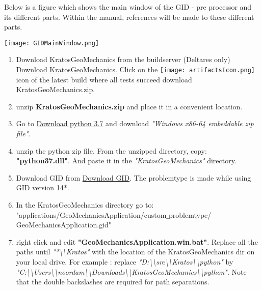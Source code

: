 Below is a figure which shows the main window of the GID - pre processor and its different parts. Within the manual, references will be made to these different parts.

\texttt{[image: GIDMainWindow.png]} 



\begin{enumerate}
	\setlength\itemsep{2mm}
	
	\item Download KratosGeoMechanics from the buildserver (Deltares only) \href{https://build.deltares.nl/viewType.html?buildTypeId=GEOFEA_KratosGeo_Compile}{Download KratosGeoMechanics}. Click on the \texttt{[image: artifactsIcon.png]} icon of the latest build where all tests succeed download KratosGeoMechanics.zip.
	
	\item unzip \textbf{KratosGeoMechanics.zip} and place it in a convenient location.
	
	\item Go to \href{https://www.python.org/downloads/release/python-375/} {Download python 3.7} and download \textit{"Windows x86-64 embeddable zip file"}.
	
	\item unzip the python zip file. From the unzipped directory, copy: \textbf{"python37.dll"}. And paste it in the \textit{"KratosGeoMechanics"} directory.
	
	\item Download GID from \href{https://www.gidhome.com/download/official-versions/}{Download GID}. The problemtype is made while using GID version 14*. 
	
	\item In the KratosGeoMechanics directory go to: \newline "applications/GeoMechanicsApplication/custom$\_$problemtype/ \newline GeoMechanicsApplication.gid"
	
	\item right click and edit \textbf{"GeoMechanicsApplication.win.bat"}. Replace all the paths until \textit{"*\textbackslash\textbackslash Kratos"} with the location of the KratosGeoMechanics dir on your local drive. For example :
	replace \textit{"D:\textbackslash\textbackslash src\textbackslash\textbackslash Kratos\textbackslash\textbackslash python"} by \newline \textit{"C:\textbackslash\textbackslash Users\textbackslash\textbackslash noordam\textbackslash\textbackslash Downloads\textbackslash\textbackslash KratosGeoMechanics\textbackslash\textbackslash python"}. Note that the double backslashes are required for path separations.
		

\end{enumerate}
